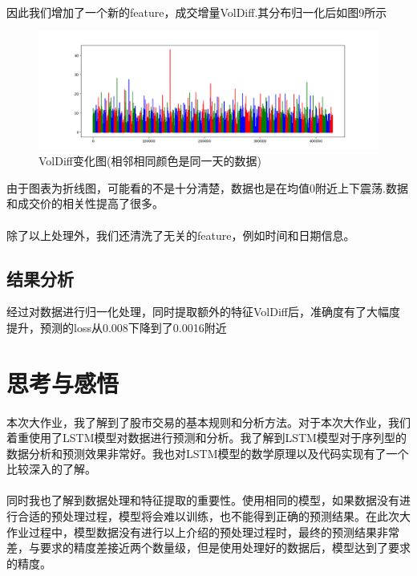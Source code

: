 \documentclass[UTF8]{ctexart}
\begin{document}
\paragraph{}因此我们增加了一个新的feature，成交增量VolDiff.其分布归一化后如图9所示
\begin{figure}[!htbp]
    \centering
    \includegraphics[scale = 0.4]{p9_2.png}
    \caption{VolDiff变化图(相邻相同颜色是同一天的数据)}
\end{figure}
由于图表为折线图，可能看的不是十分清楚，数据也是在均值0附近上下震荡.数据和成交价的相关性提高了很多。
\paragraph{}除了以上处理外，我们还清洗了无关的feature，例如时间和日期信息。
\subsection{结果分析}
经过对数据进行归一化处理，同时提取额外的特征VolDiff后，准确度有了大幅度提升，预测的loss从0.008下降到了0.0016附近

\section{思考与感悟}
\paragraph{}本次大作业，我了解到了股市交易的基本规则和分析方法。对于本次大作业，我们着重使用了LSTM模型对数据进行预测和分析。我了解到LSTM模型对于序列型的数据分析和预测效果非常好。我也对LSTM模型的数学原理以及代码实现有了一个比较深入的了解。
\paragraph{}同时我也了解到数据处理和特征提取的重要性。使用相同的模型，如果数据没有进行合适的预处理过程，模型将会难以训练，也不能得到正确的预测结果。在此次大作业过程中，模型数据没有进行以上介绍的预处理过程时，最终的预测结果非常差，与要求的精度差接近两个数量级，但是使用处理好的数据后，模型达到了要求的精度。
\end{document}
